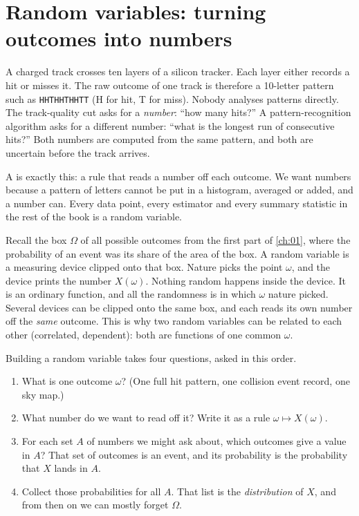 \section{Random variables: turning outcomes into numbers}
\label{1b:sec:rv}

A charged track crosses ten layers of a silicon tracker. Each layer either
records a hit or misses it. The raw outcome of one track is therefore a
10-letter pattern such as \texttt{HHTHHTHHTT} (H for hit, T for miss). Nobody
analyses patterns directly. The track-quality cut asks for a \emph{number}:
``how many hits?'' A pattern-recognition algorithm asks for a different
number: ``what is the longest run of consecutive hits?'' Both numbers are
computed from the same pattern, and both are uncertain before the track
arrives.

A  is exactly this: a rule that reads a number off
each outcome. We want numbers because a pattern of letters cannot be put in a
histogram, averaged or added, and a number can. Every data point, every
estimator and every summary statistic in the rest of the book is a random
variable.

Recall the box $\Omega$ of all possible outcomes from the first part of
\cref{ch:01}, where the probability of an event was its share of the area of
the box. A random variable is a measuring device clipped onto that box.
Nature picks the point $\omega$, and the device prints the number
$X(\omega)$. Nothing random happens inside the device. It is an ordinary
function, and all the randomness is in which $\omega$ nature picked. Several
devices can be clipped onto the same box, and each reads its own number off
the \emph{same} outcome. This is why two random variables can be related to
each other (correlated, dependent): both are functions of one common
$\omega$.

Building a random variable takes four questions, asked in this order.
\begin{enumerate}[leftmargin=1.5em,itemsep=1pt]
  \item What is one outcome $\omega$? (One full hit pattern, one collision
        event record, one sky map.)
  \item What number do we want to read off it? Write it as a rule
        $\omega\mapsto X(\omega)$.
  \item For each set $A$ of numbers we might ask about, which outcomes give a
        value in $A$? That set of outcomes is an event, and its probability is
        the probability that $X$ lands in $A$.
  \item Collect those probabilities for all $A$. That list is the
        \emph{distribution} of $X$, and from then on we can mostly forget
        $\Omega$.
\end{enumerate}

